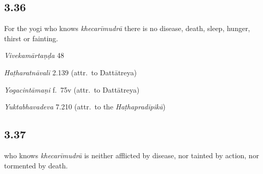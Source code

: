 \begin{ekdosis}
\subsection*{3.36}
\begin{translation}[hp03_036]
For the yogi who knows \emph{khecarīmudrā} there is no disease, death, sleep, hunger, thirst or fainting.
\end{translation}

\begin{sources}[hp03_036]
\emph{Vivekamārtaṇḍa} 48
\begin{versinnote}
\tl{\var{tandrā ] tasya \vl}\\!}
\end{versinnote}
\end{sources}

\begin{testimonia}[hp03_036]
\emph{Haṭharatnāvalī} 2.139 (attr.~to Dattātreya)
\begin{versinnote}
\end{versinnote}

\emph{Yogacintāmaṇi} f.~75v (attr.~to Dattātreya)
\begin{versinnote}
\end{versinnote}

\emph{Yuktabhavadeva} 7.210 (attr.~to the \emph{Haṭhapradīpikā})
\begin{versinnote}
\end{versinnote}
\end{testimonia}


\subsection*{3.37}
\begin{translation} who knows \emph{khecarīmudrā} is neither afflicted by disease, nor tainted by action, nor tormented by death.
\end{translation}


\end{ekdosis}
